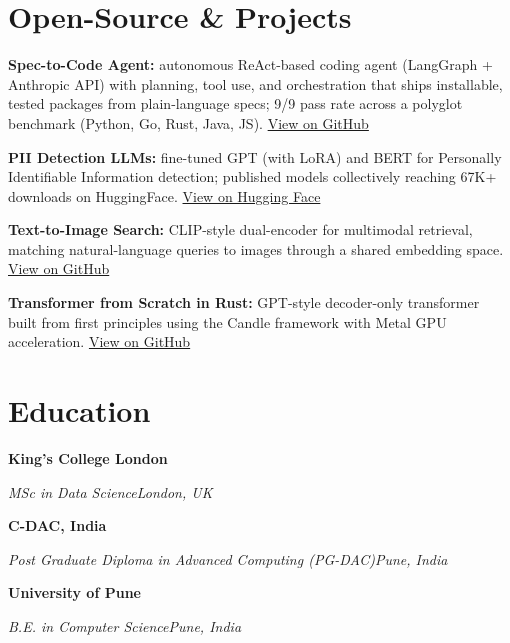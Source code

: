\documentclass[10pt,a4paper]{article}
\newcommand{\entry}[4]{%
  {\color{company}\bfseries #1}\hfill {\color{muted}#2}\par
  \vspace{1pt}
  {\itshape #3}\hfill {\color{muted}\itshape #4}\par
  \vspace{3pt}%
}
\begin{document}
\section{Open-Source \& Projects}
\begin{tight}
  \item \textbf{Spec-to-Code Agent:} autonomous ReAct-based coding agent (LangGraph + Anthropic API) with planning, tool use, and orchestration that ships installable, tested packages from plain-language specs; 9/9 pass rate across a polyglot benchmark (Python, Go, Rust, Java, JS). \href{https://github.com/abhijeetscode/Spec-to-Code-Agent}{View on GitHub}
  \item \textbf{PII Detection LLMs:} fine-tuned GPT (with LoRA) and BERT for Personally Identifiable Information detection; published models collectively reaching 67K+ downloads on HuggingFace. \href{https://huggingface.co/ab-ai/pii_model}{View on Hugging Face}
  \item \textbf{Text-to-Image Search:} CLIP-style dual-encoder for multimodal retrieval, matching natural-language queries to images through a shared embedding space. \href{https://github.com/abhijeetscode/text-to-image-search}{View on GitHub}
  \item \textbf{Transformer from Scratch in Rust:} GPT-style decoder-only transformer built from first principles using the Candle framework with Metal GPU acceleration. \href{https://github.com/abhijeetscode/transformer-rust}{View on GitHub}
\end{tight}

\section{Education}
\entry{King's College London}{}{MSc in Data Science}{London, UK}
\vspace{-3pt}
\entry{C-DAC, India}{}{Post Graduate Diploma in Advanced Computing (PG-DAC)}{Pune, India}
\vspace{-3pt}
\entry{University of Pune}{}{B.E. in Computer Science}{Pune, India}
\end{document}

